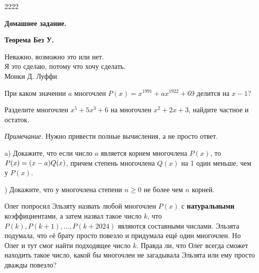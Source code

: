 2222\hspace{3mm}

\centerline{\bf \Huge Домашнее задание.}
\centerline{\bf \Huge Теорема Без У.}

\begin{flushright}
    \scriptsize{Неважно, возможно это или нет. \\Я это сделаю, потому что хочу сделать.\\ Монки Д. Луффи}
\end{flushright}

 При каком значении $a$ многочлен $P(x) = x^{1991} + ax^{1922} + 69$ делится на $x-1$?

 Разделите многочлен $x^5 + 5x^3 + 6$ на многочлен $x^2 + 2x + 3$, найдите частное и остаток.

\textit{Примечание.} Нужно привести полные вычисления, а не просто ответ.


 a) Докажите, что если число $a$ является корнем многочлена $P(x)$, то $P(x) =\\ (x-a)Q(x)$, причем степень многочлена $Q(x)$ на 1 один меньше, чем у $P(x)$.

) Докажите, что у многочлена степени $n \geq 0$ не более чем $n$ корней.

 Олег попросил Эльзяту назвать любой многочлен $P(x)$ с \textbf{натуральными} коэффициентами, а затем назвал такое число $k$, что $P(k), P(k+1), \dotsc, P(k+2024)$ являются составными числами. Эльзята подумала, что eё брату просто повезло и придумала ещё один многочлен. Но Олег и тут смог найти подходящее число $k$. Правда ли, что Олег всегда сможет находить такое число, какой бы многочлен не загадывала Эльзята или ему просто дважды повезло?